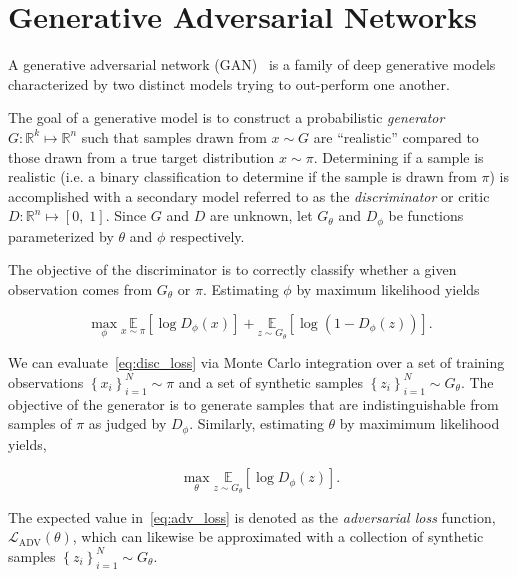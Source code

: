 \section{Generative Adversarial Networks}\label{sec:generative-adversarial-networks}

A generative adversarial network (GAN)~\cite{gan_goodfellow} is a family of deep generative models characterized by two
distinct models trying to out-perform one another.

The goal of a generative model is to construct a probabilistic \textit{generator} $G: \mathbb{R}^k \mapsto \mathbb{R}^n$
such that samples drawn from $x \sim G$ are ``realistic'' compared to those drawn from a true target distribution
$x \sim \pi$.
Determining if a sample is realistic  (i.e. a binary classification to determine if the sample is drawn from $\pi$) is
accomplished with a secondary model referred to as the \textit{discriminator} or critic $D: \mathbb{R}^n \mapsto [0, \; 1]$.
Since $G$ and $D$ are unknown, let $G_\theta$ and $D_\phi$ be functions parameterized by $\theta$ and $\phi$ respectively.

The objective of the discriminator is to correctly classify whether a given observation comes from $G_\theta$ or $\pi$.
Estimating $\phi$ by maximum likelihood yields

\begin{equation}
    \max_{\phi} \underset{x \sim \pi}{\mathbb{E}}\left[ \log D_\phi(x) \right] + \underset{z \sim G_\theta}{\mathbb{E}}\left[ \log \left( 1 - D_\phi(z)\right) \right].
    \label{eq:disc_loss}
\end{equation}

We can evaluate~\eqref{eq:disc_loss} via Monte Carlo integration over a set of training observations
$\left\{ x_i \right\}_{i=1}^N \sim \pi$ and a set of synthetic samples $\left\{ z_i \right\}_{i=1}^N \sim G_\theta$.
The objective of the generator is to generate samples that are indistinguishable from samples of $\pi$ as judged by $D_\phi$.
Similarly, estimating $\theta$ by maximimum likelihood yields,

\begin{equation}
    \max_{\theta} \underset{z \sim G_\theta}{\mathbb{E}}\left[ \log D_\phi(z) \right].
    \label{eq:adv_loss}
\end{equation}

The expected value in~\eqref{eq:adv_loss} is denoted as the \textit{adversarial loss} function,
$\mathcal{L}_{\text{ADV}}(\theta)$, which can likewise be approximated with a collection of synthetic samples
$\left\{ z_i \right\}_{i=1}^N \sim G_\theta$.

